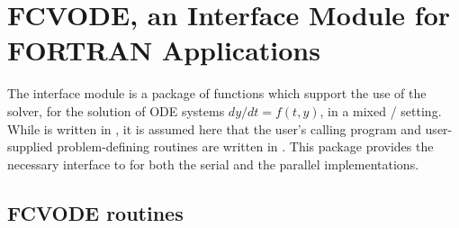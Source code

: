 \chapter{FCVODE, an Interface Module for FORTRAN Applications}\label{s:fcmix}

The {\fcvode} interface module is a package of {\C} functions which support
the use of the {\cvode} solver, for the solution of ODE systems 
$dy/dt = f(t,y)$, in a mixed {\F}/{\C} setting.  While {\cvode} is written
in {\C}, it is assumed here that the user's calling program and
user-supplied problem-defining routines are written in {\F}.
This package provides the necessary interface to {\cvode} for both the
serial and the parallel {\nvector} implementations.

\section{FCVODE routines}\label{sss:fcvroutines}

